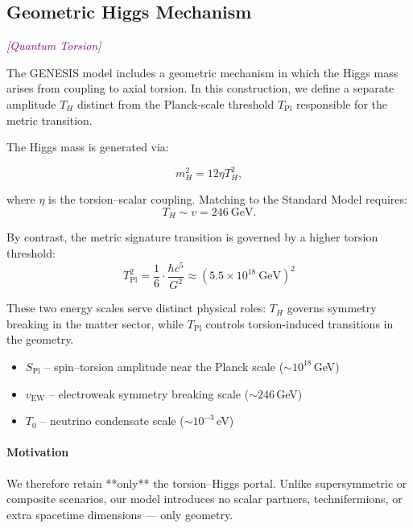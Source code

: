 \documentclass{article}
\newcommand{\quantumtag}{\textcolor{purple}{\textit{[Quantum Torsion]}}}
\begin{document}
\subsection{Geometric Higgs Mechanism}
\label{subsec:geometric_higgs}
\label{sec:higgs-portal}
\quantumtag


The GENESIS model includes a geometric mechanism in which the Higgs mass arises from coupling to axial torsion. In this construction, we define a separate amplitude \( T_H \) distinct from the Planck-scale threshold \( T_{\mathrm{Pl}} \) responsible for the metric transition.

The Higgs mass is generated via:

\begin{equation}
m_H^2 = 12 \eta T_H^2,
\end{equation}

where \( \eta \) is the torsion–scalar coupling. Matching to the Standard Model requires:
\begin{equation}\label{eq:auto119}
T_H \sim v = 246\ \mathrm{GeV}.
\end{equation}

By contrast, the metric signature transition is governed by a higher torsion threshold:
\begin{equation}\label{eq:auto120}
T_{\mathrm{Pl}}^2 = \frac{1}{6} \cdot \frac{\hbar c^5}{G^2} \approx \left(5.5 \times 10^{18}\ \mathrm{GeV}\right)^2
\end{equation}

These two energy scales serve distinct physical roles: \( T_H \) governs symmetry breaking in the matter sector, while \( T_{\mathrm{Pl}} \) controls torsion-induced transitions in the geometry.






\begin{itemize}
  \item $S_{\text{Pl}}$ – spin–torsion amplitude near the Planck scale ($\sim 10^{18}$ GeV)
  \item $v_{\text{EW}}$ – electroweak symmetry breaking scale ($\sim 246$ GeV)
  \item $T_0$ – neutrino condensate scale ($\sim 10^{-3}$ eV)
\end{itemize}



\paragraph{Motivation} We therefore retain **only** the torsion–Higgs portal. Unlike supersymmetric or composite scenarios, our model introduces no scalar partners, technifermions, or extra spacetime dimensions — only geometry.
\end{document}
